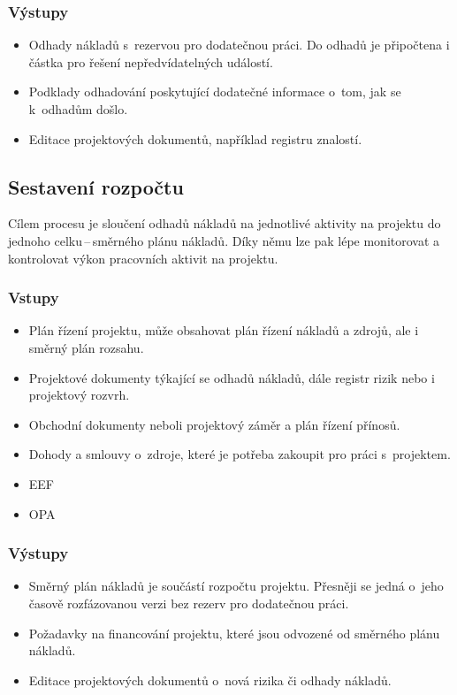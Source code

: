 \subsubsection*{Výstupy}
\begin{itemize}
    \item Odhady nákladů s~rezervou pro dodatečnou práci. Do odhadů je připočtena i částka pro řešení nepředvídatelných událostí. 
    \item Podklady odhadování poskytující dodatečné informace o~tom, jak se k~odhadům došlo.
    \item Editace projektových dokumentů, například registru znalostí.
\end{itemize}

\subsection*{Sestavení rozpočtu}

Cílem procesu je sloučení odhadů nákladů na jednotlivé aktivity na projektu do jednoho celku\,--\,směrného plánu nákladů.  Díky němu lze pak lépe monitorovat a kontrolovat výkon pracovních aktivit na projektu. 

\subsubsection*{Vstupy}
\begin{itemize}
    \item Plán řízení projektu, může obsahovat plán řízení nákladů a zdrojů, ale i směrný plán rozsahu.
    \item Projektové dokumenty týkající se odhadů nákladů, dále registr rizik nebo i projektový rozvrh.
    \item Obchodní dokumenty neboli projektový záměr a plán řízení přínosů.
    \item Dohody a smlouvy o~zdroje, které je potřeba zakoupit pro práci s~projektem.
    \item EEF
    \item OPA
\end{itemize}
\subsubsection*{Výstupy}
\begin{itemize}
    \item Směrný plán nákladů je součástí rozpočtu projektu. Přesněji se jedná o~jeho časově rozfázovanou verzi bez rezerv pro dodatečnou práci. 
    \item Požadavky na financování projektu, které jsou odvozené od směrného plánu nákladů.
    \item Editace projektových dokumentů o~nová rizika či odhady nákladů.
\end{itemize}


